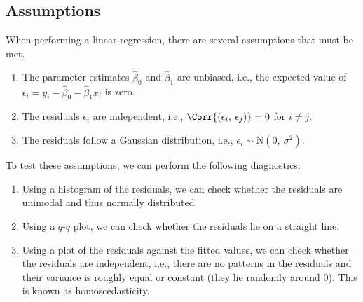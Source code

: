 \documentclass{article}
\begin{document}
\subsection{Assumptions}
When performing a linear regression, there are several assumptions that
must be met.
\begin{enumerate}
    \item The parameter estimates \(\hat{\beta}_0\) and
          \(\hat{\beta}_1\) are unbiased, i.e., the expected value of
          \(\epsilon_i = y_i - \hat{\beta}_0 - \hat{\beta}_1 x_i\) is
          zero.
    \item The residuals \(\epsilon_i\) are independent, i.e.,
          \(\Corr{\left( \epsilon_i,\: \epsilon_j \right)} = 0\) for
          \(i \neq j\).
    \item The residuals follow a Gaussian distribution, i.e.,
          \(\epsilon_i \sim \mathrm{N}\left( 0,\: \sigma^2 \right)\).
\end{enumerate}
To test these assumptions, we can perform the following diagnostics:
\begin{enumerate}
    \item Using a histogram of the residuals, we can check whether the
          residuals are unimodal and thus normally distributed.
    \item Using a \(q\)-\(q\) plot, we can check whether the residuals
          lie on a straight line.
    \item Using a plot of the residuals against the fitted values, we
          can check whether the residuals are independent, i.e., there
          are no patterns in the residuals and their variance is
          roughly equal or constant (they lie randomly around 0). This
          is known as homoscedasticity.
\end{enumerate}
\end{document}
